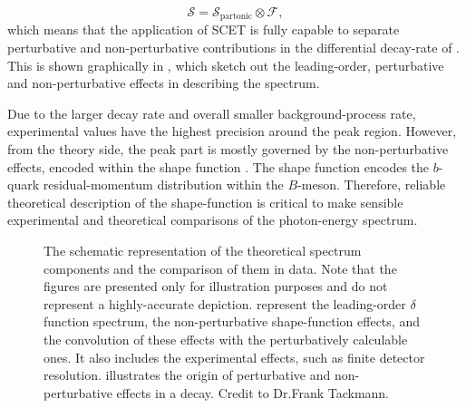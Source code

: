 \begin{equation}\label{eq:factorisation}
    \mathcal{S} = \mathcal{S}_{\mathrm{partonic}} \otimes \mathcal{F},
\end{equation}
which means that the application of SCET is fully capable to separate perturbative and non-perturbative contributions in the differential decay-rate of \BtoXsgamma.
This is shown graphically in , which sketch out the leading-order, perturbative and non-perturbative effects in describing the \BtoXsgamma spectrum.

Due to the larger \BtoXsgamma decay rate and overall smaller background-process rate, experimental values have the highest precision around the peak region.
However, from the theory side, the peak part is mostly governed by the non-perturbative effects, encoded within the shape function \cite{Ligeti:2008ac}.
The shape function encodes the $b$-quark residual-momentum distribution within the $B$-meson. 
Therefore, reliable theoretical description of the shape-function is critical to make sensible experimental and theoretical comparisons of the photon-energy spectrum. 

\begin{figure}[htbp!]
    \caption{\label{fig:xsgamma_theory_sketches} 
    The schematic representation of the theoretical \BtoXsgamma spectrum components and the comparison of them in data.
    Note that the figures are presented only for illustration purposes and do not represent a highly-accurate depiction.
     represent the leading-order $\delta$ function spectrum, the non-perturbative shape-function effects, and the convolution of these effects with the perturbatively calculable ones.
    It also includes the experimental effects, such as finite detector resolution.
     illustrates the origin of perturbative and non-perturbative effects in a \BtoXsgamma decay.
    Credit to Dr.Frank Tackmann.}
\end{figure}

